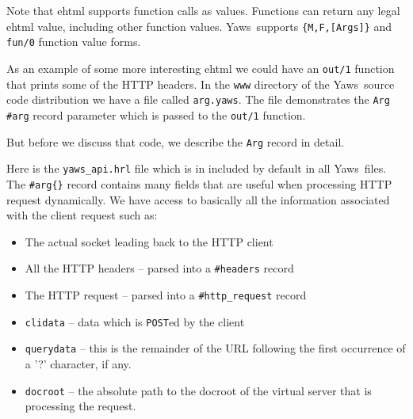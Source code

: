 \documentclass[11pt,oneside,english]{book}
\newcommand{\Yaws}            %
        {{\sc Yaws}}
\begin{document}
Note that ehtml supports function calls as values. Functions can
return any legal ehtml value, including other function
values. \Yaws\ supports \verb+{M,F,[Args]}+ and \verb+fun/0+ function
value forms.

As an example of some more interesting ehtml we could have an
\verb+out/1+ function that prints some of the HTTP headers.  In the
\verb+www+ directory of the \Yaws\ source code distribution we have a
file called \verb+arg.yaws+. The file demonstrates the \verb+Arg+
\verb+#arg+ record parameter which is passed to the \verb+out/1+
function.

But before we discuss that code, we describe the \verb+Arg+ record
in detail.

Here is the \verb+yaws_api.hrl+ file which is in included by default
in all \Yaws\ files. The \verb+#arg{}+ record contains many fields
that are useful when processing HTTP request dynamically.  We have
access to basically all the information associated with the client
request such as:

\begin{itemize}

\item The actual socket leading back to the HTTP client
\item All the HTTP headers -- parsed into a \verb+#headers+ record
\item The HTTP request -- parsed into a \verb+#http_request+ record
\item \verb+clidata+ -- data which is \verb+POST+ed by the client
\item \verb+querydata+ -- this is the remainder of the URL following
  the first occurrence of a '?' character, if any.
\item \verb+docroot+ -- the absolute path to the docroot of the
  virtual server that is processing the request.
\end{itemize}
\end{document}
